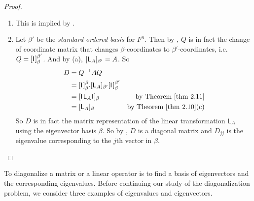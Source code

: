 \begin{proof} \ 

\begin{enumerate}
\item This is implied by .

\item
Let \(\beta'\) be the \emph{standard ordered basis} for \(F^n\).
Then by , \(Q\) is in fact the change of coordinate matrix that changes \(\beta\)-coordinates to \(\beta'\)-coordinates, i.e. \(Q = [\textsf{I}_{_{}}]_{\beta}^{\beta'}\).
And by (a), \([\textsf{L}_A]_{\beta'} = A\).
So
\begin{align*}
    D & = Q^{-1} A Q \\
      & = [\ITRAN{}]_{\beta'}^{\beta} [\LMTRAN_A]_{\beta'} [\ITRAN{}]_{\beta}^{\beta'} \\
      & = [\ITRAN{} \LMTRAN_A \ITRAN{}]_{\beta} & \text{by \THM{2.11}} \\
      & = [\LMTRAN_A]_{\beta} & \text{by \THM{2.10}(c)}
\end{align*}
So \(D\) is in fact the matrix representation of the linear transformation \(\textsf{L}_A\) using the eigenvector basis \(\beta\).
So by , \(D\) is a diagonal matrix and \(D_{jj}\) is the eigenvalue corresponding to the \(j\)th vector in \(\beta\).
\end{enumerate}
\end{proof}

To diagonalize a matrix or a linear operator is to find a basis of eigenvectors and the corresponding eigenvalues.
Before continuing our study of the diagonalization problem, we consider three examples of eigenvalues and eigenvectors.

